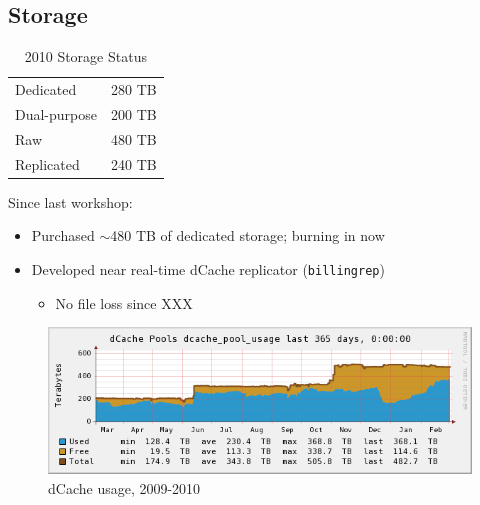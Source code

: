 \documentclass{beamer}
\newcommand{\ca}{\ensuremath{\sim}}
\begin{document}
\subsection{Storage}
\begin{frame}
\begin{table}
\begin{tabular}{lr}
	\toprule
	Dedicated			&	 280 TB \\	 %
	Dual-purpose	&	 200 TB \\	 %
	\midrule
	Raw						&	 480 TB \\
	Replicated		&	 240 TB \\
	\bottomrule
\end{tabular}
\caption{2010 Storage Status}
\label{2010_storage_status}
\end{table}

Since last workshop:
\begin{itemize}
	\item Purchased \ca{}480 TB of dedicated storage; burning in now
	\item Developed near real-time dCache replicator ({\tt billingrep})
	\begin{itemize}
		\item No file loss since XXX 
	\end{itemize}
\end{itemize}
\end{frame}

\begin{frame}
\begin{figure}
    \includegraphics[width=\textwidth]{Graphics/dcache-usage-1yr.png}
    \caption{dCache usage, 2009-2010}
\end{figure}
\end{frame}
\end{document}
